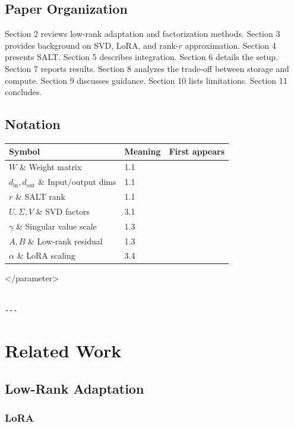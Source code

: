 \subsection{Paper Organization}

Section 2 reviews low-rank adaptation and factorization methods. Section 3 
provides background on SVD, LoRA, and rank-$r$ approximation. Section 4 
presents SALT. Section 5 describes integration. Section 6 details the setup. 
Section 7 reports results. Section 8 analyzes the trade-off between storage 
and compute. Section 9 discusses guidance. Section 10 lists limitations. 
Section 11 concludes.



\subsection{Notation}

\begin{table}[H]
\centering
\small
\begin{tabular}{lll}
\toprule
\textbf{Symbol} & \textbf{Meaning} & \textbf{First appears} \\
\midrule
$W$ \& Weight matrix & 1.1 \\
$d_\text{in}, d_\text{out}$ \& Input/output dims & 1.1 \\
$r$ \& SALT rank & 1.1 \\
$U, \Sigma, V$ \& SVD factors & 3.1 \\
$\gamma$ \& Singular value scale & 1.3 \\
$A, B$ \& Low-rank residual & 1.3 \\
$\alpha$ \& LoRA scaling & 3.4 \\
\bottomrule
\end{tabular}
\end{table}
</parameter>
\begin{lstlisting}

---
\end{lstlisting}


\section{Related Work}

\subsection{Low-Rank Adaptation}

\subsubsection{LoRA}

